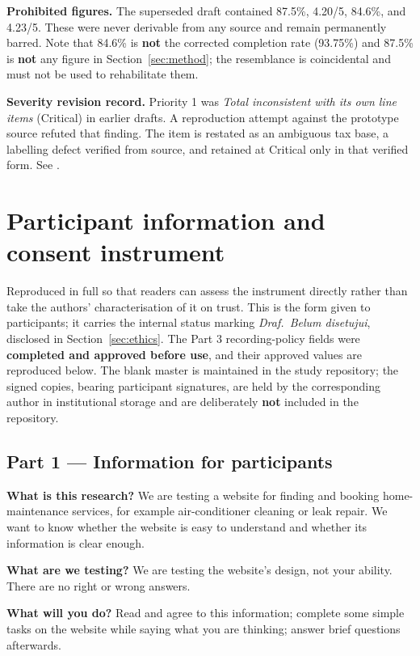 \documentclass[]{interact}
\theoremstyle{plain}
\begin{document}
\textbf{Prohibited figures.} The superseded draft contained 87.5\%, 4.20/5, 84.6\%, and 4.23/5. These
were never derivable from any source and remain permanently barred. Note that 84.6\% is \textbf{not}
the corrected completion rate (93.75\%) and 87.5\% is \textbf{not} any figure in
Section~\ref{sec:method}; the resemblance is coincidental and must not be used to rehabilitate them.

\textbf{Severity revision record.} Priority 1 was \emph{Total inconsistent with its own line items}
(Critical) in earlier drafts. A reproduction attempt against the prototype source refuted that finding.
The item is restated as an ambiguous tax base, a labelling defect verified from source, and retained at
Critical only in that verified form. See \citet{braniwati2026price}.

\section{Participant information and consent instrument}
\label{app:consent}

Reproduced in full so that readers can assess the instrument directly rather than take the authors'
characterisation of it on trust. This is the form given to participants; it carries the internal status
marking \emph{Draf.\ Belum disetujui}, disclosed in Section~\ref{sec:ethics}. The Part 3
recording-policy fields were \textbf{completed and approved before use}, and their approved values are
reproduced below. The blank master is maintained in the study repository; the signed copies, bearing
participant signatures, are held by the corresponding author in institutional storage and are
deliberately \textbf{not} included in the repository.

\subsection*{Part 1 --- Information for participants}

\textbf{What is this research?} We are testing a website for finding and booking home-maintenance
services, for example air-conditioner cleaning or leak repair. We want to know whether the website is
easy to understand and whether its information is clear enough.

\textbf{What are we testing?} We are testing the website's design, not your ability. There are no right
or wrong answers.

\textbf{What will you do?} Read and agree to this information; complete some simple tasks on the
website while saying what you are thinking; answer brief questions afterwards.
\end{document}
